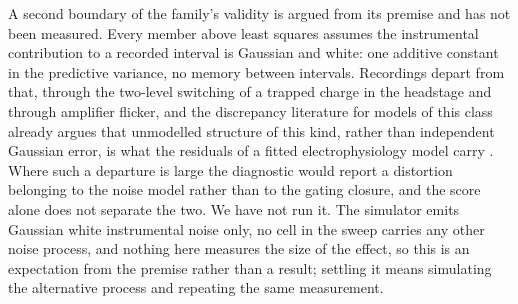 A second boundary of the family's validity is argued from its premise and has not been measured. Every member above least squares assumes the instrumental contribution to a recorded interval is Gaussian and white: one additive constant in the predictive variance, no memory between intervals. Recordings depart from that, through the two-level switching of a trapped charge in the headstage and through amplifier flicker, and the discrepancy literature for models of this class already argues that unmodelled structure of this kind, rather than independent Gaussian error, is what the residuals of a fitted electrophysiology model carry \cite{lei2020considering}. %
Where such a departure is large the diagnostic would report a distortion belonging to the noise model rather than to the gating closure, and the score alone does not separate the two. We have not run it. The simulator emits Gaussian white instrumental noise only, no cell in the sweep carries any other noise process, and nothing here measures the size of the effect, so this is an expectation from the premise rather than a result; settling it means simulating the alternative process and repeating the same measurement.

